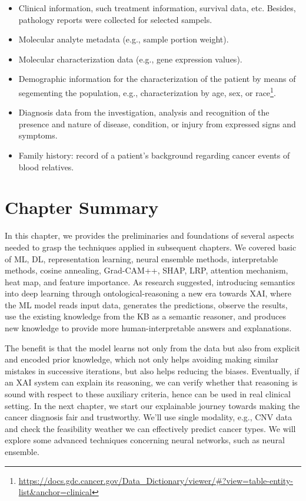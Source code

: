 \begin{itemize}[noitemsep]
    \item Clinical information, such treatment information, survival data, etc. Besides, pathology reports were collected for selected sampels. 
    \item Molecular analyte metadata (e.g., sample portion weight).
    \item Molecular characterization data (e.g., gene expression values).
    \item Demographic information for the characterization of the patient by means of segementing the population, e.g., characterization by age, sex, or race\footnote{\url{https://docs.gdc.cancer.gov/Data_Dictionary/viewer/\#?view=table-entity-list&anchor=clinical}}.
    \item Diagnosis data from the investigation, analysis and recognition of the presence and nature of disease, condition, or injury from expressed signs and symptoms. 
    \item Family history: record of a patient's background regarding cancer events of blood relatives.
\end{itemize}

\section{Chapter Summary}
In this chapter, we provides the preliminaries and foundations of several aspects needed to grasp the techniques applied in subsequent chapters. We covered basic of ML, DL, representation learning, neural ensemble methods, interpretable methods, cosine annealing, Grad-CAM++, SHAP, LRP, attention mechanism, heat map, and feature importance. As research suggested, introducing semantics into deep learning through ontological-reasoning a new era towards XAI, where the ML model reads input data, generates the predictions, observe the results, use the existing knowledge from the KB as a semantic reasoner, and produces new knowledge to provide more human-interpretable answers and explanations. 

\hspace*{3.5mm} The benefit is that the model learns not only from the data but also from explicit and encoded prior knowledge, which not only helps avoiding making similar mistakes in successive iterations, but also helps reducing the biases. Eventually, if an XAI system can explain its reasoning, we can verify whether that reasoning is sound with respect to these auxiliary criteria, hence can be used in real clinical setting. In the next chapter, we start our explainable journey towards making the cancer diagnosis fair and trustworthy. We'll use single modality, e.g., CNV data and check the feasibility weather we can effectively predict cancer types. We will explore some advanced techniques concerning neural networks, such as neural ensemble. 